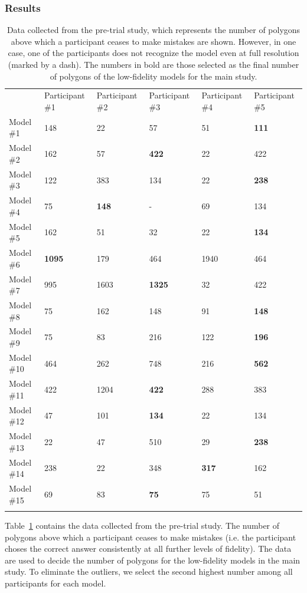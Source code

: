 \subsubsection{Results}

\begin{table}[!htbp]
\caption{Data collected from the pre-trial study, which represents the number of polygons above which a participant ceases to make mistakes are shown. However, in one case, one of the participants does not recognize the model even at full resolution (marked by a dash). The numbers in bold are those selected as the final number of polygons of the low-fidelity models for the main study.}
\label{tab:pts}
\begin{tabular}{llllll}
\hline\noalign{\smallskip}
& Participant \#1 & Participant \#2 & Participant \#3 & Participant \#4 & Participant \#5 \\
\noalign{\smallskip}\hline\noalign{\smallskip}
Model \#1 & 148 & 22 & 57 & 51 & \textbf{111} \\
Model \#2 & 162 & 57 & \textbf{422} & 22 & 422 \\
Model \#3 & 122 & 383 & 134 & 22 & \textbf{238} \\
Model \#4 & 75 & \textbf{148} & - & 69 & 134 \\
Model \#5 & 162 & 51 & 32 & 22 & \textbf{134} \\
Model \#6 & \textbf{1095} & 179 & 464 & 1940 & 464 \\
Model \#7 & 995 & 1603 & \textbf{1325} & 32 & 422 \\
Model \#8 & 75 & 162 & 148 & 91 & \textbf{148} \\
Model \#9 & 75 & 83 & 216 & 122 & \textbf{196} \\
Model \#10 & 464 & 262 & 748 & 216 & \textbf{562} \\
Model \#11 & 422 & 1204 & \textbf{422} & 288 & 383 \\
Model \#12 & 47 & 101 & \textbf{134} & 22 & 134 \\
Model \#13 & 22 & 47 & 510 & 29 & \textbf{238} \\
Model \#14 & 238 & 22 & 348 & \textbf{317} & 162 \\
Model \#15 & 69 & 83 & \textbf{75} & 75 & 51 \\
\noalign{\smallskip}\hline
\end{tabular}
\end{table}

Table~\ref{tab:pts} contains the data collected from the pre-trial study. The number of polygons above which a participant ceases to make mistakes (i.e. the participant choses the correct answer consistently at all further levels of fidelity). The data are used to decide the number of polygons for the low-fidelity models in the main study. To eliminate the outliers, we select the second highest number among all participants for each model.

